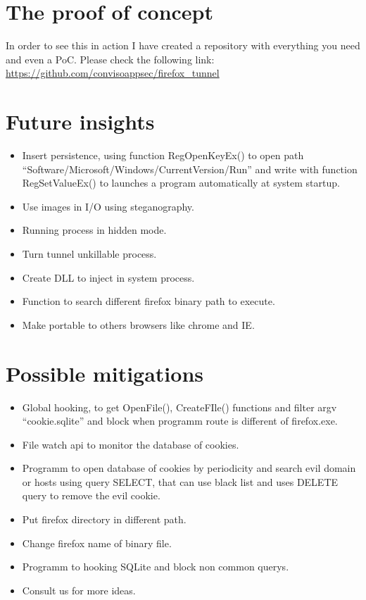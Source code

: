 \documentclass[tog]{acmsiggraph}
\begin{document}
\section{The proof of concept}

In order to see this in action I have created a repository with everything you need and even a PoC. Please check the following link:
{\small\url{https://github.com/convisoappsec/firefox_tunnel}}

\section{Future insights}

\begin{itemize}
\item Insert persistence, using function RegOpenKeyEx() to  open path “Software/Microsoft/Windows/CurrentVersion/Run” and write with function RegSetValueEx() to launches a program automatically at system startup.
\item Use images in I/O using steganography.
\item Running process in  hidden mode.
\item Turn tunnel unkillable process.
\item Create DLL to inject in system process.
\item Function  to search different firefox binary path to execute.
\item Make portable to others browsers like chrome and IE.
\end{itemize}

\section{Possible mitigations}

\begin{itemize}
\item Global hooking, to get  OpenFile(), CreateFIle() functions and filter argv “cookie.sqlite” and block  when programm route is different of firefox.exe.
\item File watch api to monitor the database of cookies.
\item Programm to open database of cookies by periodicity and search evil domain or  hosts using query SELECT, that can use black list and uses DELETE query to remove the evil cookie.
\item Put firefox directory in different path.
\item Change firefox name of  binary file.
\item Programm to hooking SQLite and block non common querys.
\item Consult us for more ideas.
\end{itemize}
\end{document}
